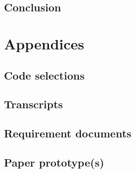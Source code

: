 \documentclass[]{report}
\begin{document}
{}



\section{Conclusion}

\chapter{Appendices}
\section{Code selections}

\section{Transcripts}

\section{Requirement documents}

\section{Paper prototype(s)}
\end{document}
